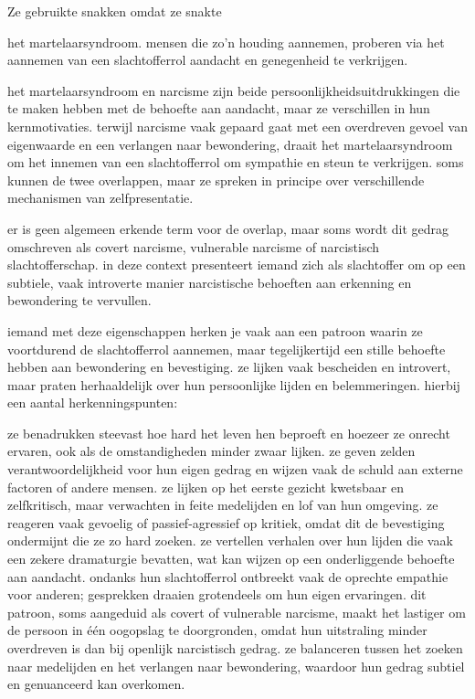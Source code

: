 Ze gebruikte snakken
omdat ze snakte

het martelaarsyndroom. mensen die zo'n houding aannemen, proberen via het aannemen van een slachtofferrol aandacht en genegenheid te verkrijgen.

het martelaarsyndroom en narcisme zijn beide persoonlijkheidsuitdrukkingen die te maken hebben met de behoefte aan aandacht, maar ze verschillen in hun kernmotivaties. terwijl narcisme vaak gepaard gaat met een overdreven gevoel van eigenwaarde en een verlangen naar bewondering, draait het martelaarsyndroom om het innemen van een slachtofferrol om sympathie en steun te verkrijgen. soms kunnen de twee overlappen, maar ze spreken in principe over verschillende mechanismen van zelfpresentatie.

er is geen algemeen erkende term voor de overlap, maar soms wordt dit gedrag omschreven als covert narcisme, vulnerable narcisme of narcistisch slachtofferschap. in deze context presenteert iemand zich als slachtoffer om op een subtiele, vaak introverte manier narcistische behoeften aan erkenning en bewondering te vervullen.

iemand met deze eigenschappen herken je vaak aan een patroon waarin ze voortdurend de slachtofferrol aannemen, maar tegelijkertijd een stille behoefte hebben aan bewondering en bevestiging. ze lijken vaak bescheiden en introvert, maar praten herhaaldelijk over hun persoonlijke lijden en belemmeringen. hierbij een aantal herkenningspunten:

ze benadrukken steevast hoe hard het leven hen beproeft en hoezeer ze onrecht ervaren, ook als de omstandigheden minder zwaar lijken.
ze geven zelden verantwoordelijkheid voor hun eigen gedrag en wijzen vaak de schuld aan externe factoren of andere mensen.
ze lijken op het eerste gezicht kwetsbaar en zelfkritisch, maar verwachten in feite medelijden en lof van hun omgeving.
ze reageren vaak gevoelig of passief-agressief op kritiek, omdat dit de bevestiging ondermijnt die ze zo hard zoeken.
ze vertellen verhalen over hun lijden die vaak een zekere dramaturgie bevatten, wat kan wijzen op een onderliggende behoefte aan aandacht.
ondanks hun slachtofferrol ontbreekt vaak de oprechte empathie voor anderen; gesprekken draaien grotendeels om hun eigen ervaringen.
dit patroon, soms aangeduid als covert of vulnerable narcisme, maakt het lastiger om de persoon in één oogopslag te doorgronden, omdat hun uitstraling minder overdreven is dan bij openlijk narcistisch gedrag. ze balanceren tussen het zoeken naar medelijden en het verlangen naar bewondering, waardoor hun gedrag subtiel en genuanceerd kan overkomen.


